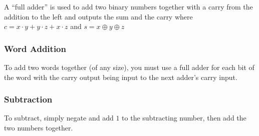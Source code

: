 A ``full adder'' is used to add two binary numbers together with a carry from the addition to the left and outputs the sum and the carry where \(c = x\cdot y + y \cdot z + x\cdot z\) and \(s = x \oplus y \oplus z\)

\subsubsection{Word Addition}\label{ssub:word_addition}

To add two words together (of any size), you must use a full adder for each bit of the word with the carry output being input to the next adder's carry input.

\subsubsection{Subtraction}\label{ssub:subtraction}

To subtract, simply negate and add \(1\) to the subtracting number, then add the two numbers together.


